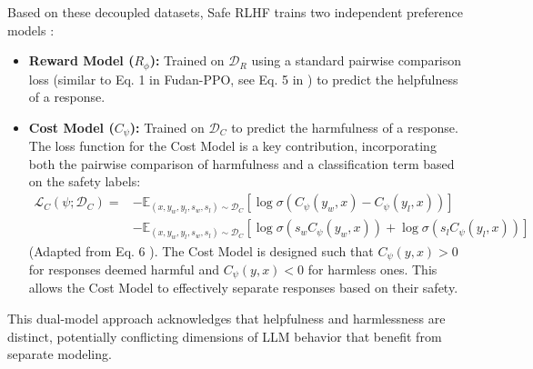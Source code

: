 \documentclass{article}
\begin{document}
Based on these decoupled datasets, Safe RLHF trains two independent preference models \cite{Dai2023SafeRLHF}:
\begin{itemize}
    \item \textbf{Reward Model ($R_\phi$):} Trained on $\mathcal{D}_R$ using a standard pairwise comparison loss (similar to Eq. 1 in Fudan-PPO, see Eq. 5 in \cite{Dai2023SafeRLHF}) to predict the helpfulness of a response.
    \item \textbf{Cost Model ($C_\psi$):} Trained on $\mathcal{D}_C$ to predict the harmfulness of a response. The loss function for the Cost Model is a key contribution, incorporating both the pairwise comparison of harmfulness and a classification term based on the safety labels:
    \begin{equation}
        \begin{split}
        \label{eq:cost_model_loss}
    \mathcal{L}_{C}(\psi;\mathcal{D}_{C}) = &-\mathbb{E}_{(x,y_w,y_l,s_w,s_l)\sim\mathcal{D}_{C}}[\log\sigma(C_{\psi}(y_w,x)-C_{\psi}(y_l,x))] \\
                         &-\mathbb{E}_{(x,y_w,y_l,s_w,s_l)\sim\mathcal{D}_{C}}[\log\sigma(s_w C_{\psi}(y_w,x))
                         + \log\sigma(s_l C_{\psi}(y_l,x))]
    \end{split}
    \end{equation}
    (Adapted from Eq. 6 \cite{Dai2023SafeRLHF}). The Cost Model is designed such that $C_\psi(y,x) > 0$ for responses deemed harmful and $C_\psi(y,x) < 0$ for harmless ones. This allows the Cost Model to effectively separate responses based on their safety.
\end{itemize}


This dual-model approach acknowledges that helpfulness and harmlessness are distinct, potentially conflicting dimensions of LLM behavior that benefit from separate modeling.
\end{document}

